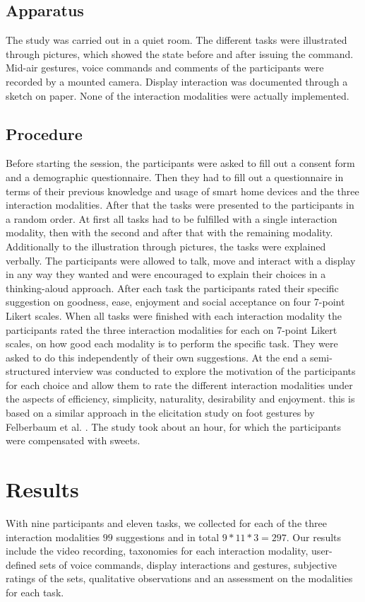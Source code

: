 \documentclass[sigchi]{acmart}
\begin{document}
\subsection{Apparatus}
The study was carried out in a quiet room. The different tasks were illustrated through pictures, which showed the state before and after issuing the command. Mid-air gestures, voice commands and comments of the participants were recorded by a mounted camera. Display interaction was documented through a sketch on paper. None of the interaction modalities were actually implemented.

\subsection{Procedure}
Before starting the session, the participants were asked to fill out a consent form and a demographic questionnaire. Then they had to fill out a questionnaire in terms of their previous knowledge and usage of smart home devices and the three interaction modalities. After that the tasks were presented to the participants in a random order. At first all tasks had to be fulfilled with a single interaction modality, then with the second and after that with the remaining modality. Additionally to the illustration through pictures, the tasks were explained verbally. The participants were allowed to talk, move and interact with a display in any way they wanted and were encouraged to explain their choices in a thinking-aloud approach. After each task the participants rated their specific suggestion on goodness, ease, enjoyment and social acceptance on four 7-point Likert scales. When all tasks were finished with each interaction modality the participants rated the three interaction modalities for each on 7-point Likert scales, on how good each modality is to perform the specific task. They were asked to do this independently of their own suggestions. At the end a semi-structured interview was conducted to explore the motivation of the participants for each choice and allow them to rate the different interaction modalities under the aspects of efficiency, simplicity, naturality, desirability and enjoyment. this is based on a similar approach in the elicitation study on foot gestures by Felberbaum et al. \cite{Felberbaum.2018}. The study took about an hour, for which the participants were compensated with sweets.

\section{Results}
With nine participants and eleven tasks, we collected for each of the three interaction modalities $99$ suggestions and in total $9*11*3=297$. Our results include the video recording, taxonomies for each interaction modality, user-defined sets of voice commands, display interactions and gestures, subjective ratings of the sets, qualitative observations and an assessment on the modalities for each task. 
\end{document}
